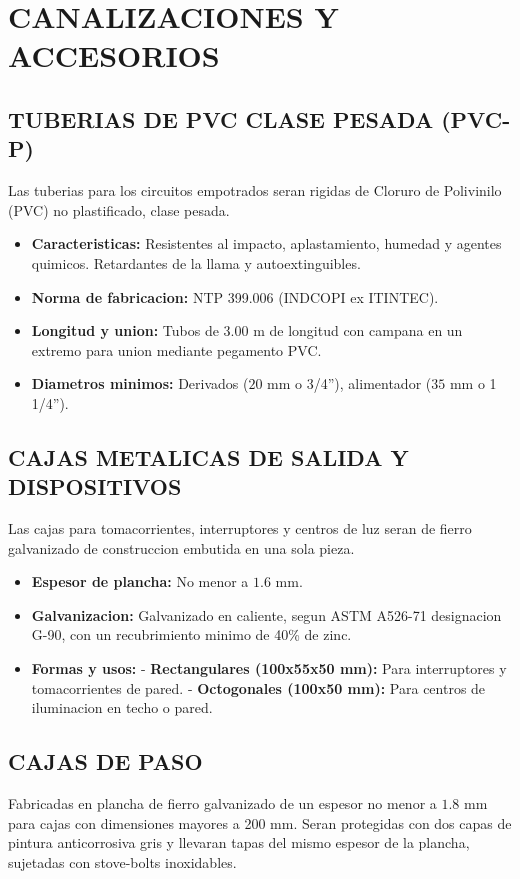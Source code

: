 \section{CANALIZACIONES Y ACCESORIOS}

\subsection{TUBERIAS DE PVC CLASE PESADA (PVC-P)}
Las tuberias para los circuitos empotrados seran rigidas de Cloruro de Polivinilo (PVC) no plastificado, clase pesada.
\begin{itemize}
  \item \textbf{Caracteristicas:} Resistentes al impacto, aplastamiento, humedad y agentes quimicos. Retardantes de la llama y autoextinguibles.
  \item \textbf{Norma de fabricacion:} NTP 399.006 (INDCOPI ex ITINTEC).
  \item \textbf{Longitud y union:} Tubos de 3.00 m de longitud con campana en un extremo para union mediante pegamento PVC.
  \item \textbf{Diametros minimos:} Derivados (\(20\text{ mm}\) o 3/4''), alimentador (\(35\text{ mm}\) o 1 1/4'').
\end{itemize}

\subsection{CAJAS METALICAS DE SALIDA Y DISPOSITIVOS}
Las cajas para tomacorrientes, interruptores y centros de luz seran de fierro galvanizado de construccion embutida en una sola pieza.
\begin{itemize}
  \item \textbf{Espesor de plancha:} No menor a \(1.6\text{ mm}\).
  \item \textbf{Galvanizacion:} Galvanizado en caliente, segun ASTM A526-71 designacion G-90, con un recubrimiento minimo de 40\% de zinc.
  \item \textbf{Formas y usos:}
    - \textbf{Rectangulares (100x55x50 mm):} Para interruptores y tomacorrientes de pared.
    - \textbf{Octogonales (100x50 mm):} Para centros de iluminacion en techo o pared.
\end{itemize}

\subsection{CAJAS DE PASO}
Fabricadas en plancha de fierro galvanizado de un espesor no menor a \(1.8\text{ mm}\) para cajas con dimensiones mayores a 200 mm. Seran protegidas con dos capas de pintura anticorrosiva gris y llevaran tapas del mismo espesor de la plancha, sujetadas con stove-bolts inoxidables.

